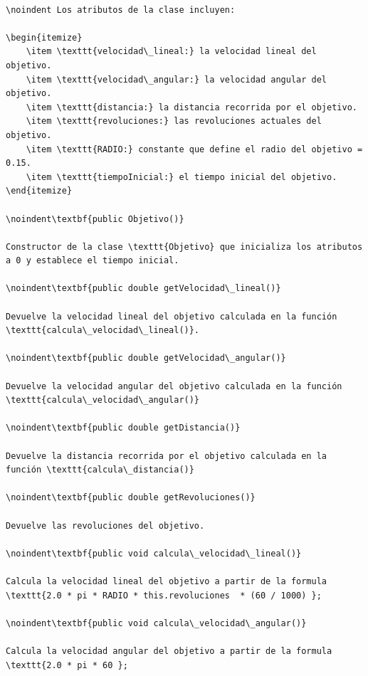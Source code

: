 \documentclass{article}
\begin{document}
\begin{lstlisting}

\noindent Los atributos de la clase incluyen:

\begin{itemize}
    \item \texttt{velocidad\_lineal:} la velocidad lineal del objetivo.
    \item \texttt{velocidad\_angular:} la velocidad angular del objetivo.
    \item \texttt{distancia:} la distancia recorrida por el objetivo.
    \item \texttt{revoluciones:} las revoluciones actuales del objetivo.
    \item \texttt{RADIO:} constante que define el radio del objetivo = 0.15.
    \item \texttt{tiempoInicial:} el tiempo inicial del objetivo.
\end{itemize}

\noindent\textbf{public Objetivo()}

Constructor de la clase \texttt{Objetivo} que inicializa los atributos a 0 y establece el tiempo inicial.

\noindent\textbf{public double getVelocidad\_lineal()}

Devuelve la velocidad lineal del objetivo calculada en la función \texttt{calcula\_velocidad\_lineal()}.

\noindent\textbf{public double getVelocidad\_angular()}

Devuelve la velocidad angular del objetivo calculada en la función \texttt{calcula\_velocidad\_angular()}

\noindent\textbf{public double getDistancia()}

Devuelve la distancia recorrida por el objetivo calculada en la función \texttt{calcula\_distancia()}

\noindent\textbf{public double getRevoluciones()}

Devuelve las revoluciones del objetivo.

\noindent\textbf{public void calcula\_velocidad\_lineal()}

Calcula la velocidad lineal del objetivo a partir de la formula \texttt{2.0 * pi * RADIO * this.revoluciones  * (60 / 1000) };

\noindent\textbf{public void calcula\_velocidad\_angular()}

Calcula la velocidad angular del objetivo a partir de la formula \texttt{2.0 * pi * 60 };


\end{lstlisting}
\end{document}
